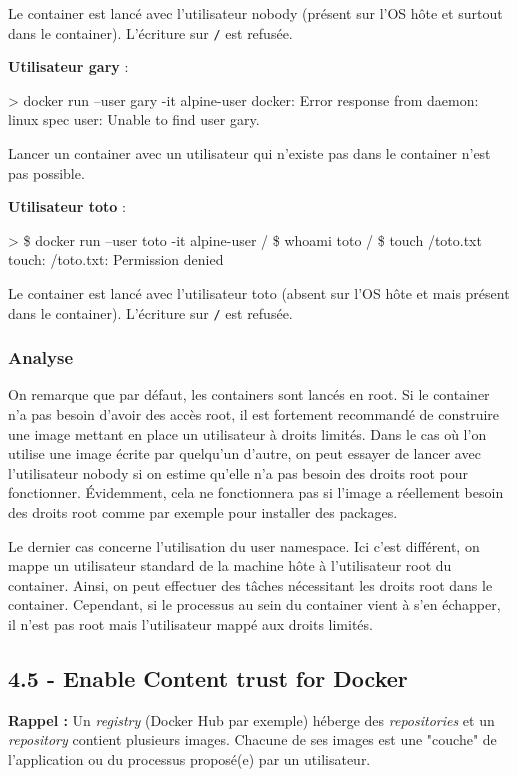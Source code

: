 \documentclass[11pt,a4paper,oneside]{report}
\newcommand{\code}[1]{\texttt{#1}}
\begin{document}
Le container est lancé avec l'utilisateur nobody (présent sur l'OS hôte et surtout dans le container). L'écriture sur \code{/} est refusée.


\textbf{Utilisateur gary} :
\begin{textcode}
> docker run --user gary -it alpine-user
docker: Error response from daemon: linux spec user: Unable to find user gary.
\end{textcode}

Lancer un container avec un utilisateur qui n'existe pas dans le container n'est pas possible.

\textbf{Utilisateur toto} :
\begin{textcode}
> \$ docker run --user toto -it alpine-user
/ \$ whoami
toto
/ \$ touch /toto.txt
touch: /toto.txt: Permission denied
\end{textcode}

Le container est lancé avec l'utilisateur toto (absent sur l'OS hôte et mais présent dans le container). L'écriture sur \code{/} est refusée.

\subsubsection{Analyse}
On remarque que par défaut, les containers sont lancés en root. Si le container n'a pas besoin d'avoir des accès root, il est fortement recommandé de construire une image mettant en place un utilisateur à droits limités. Dans le cas où l'on utilise une image écrite par quelqu'un d'autre, on peut essayer de lancer avec l'utilisateur nobody si on estime qu'elle n'a pas besoin des droits root pour fonctionner. Évidemment, cela ne fonctionnera pas si l'image a réellement besoin des droits root comme par exemple pour installer des packages.

Le dernier cas concerne l'utilisation du user namespace. Ici c'est différent, on mappe un utilisateur standard de la machine hôte à l'utilisateur root du container. Ainsi, on peut effectuer des tâches nécessitant les droits root dans le container. Cependant, si le processus au sein du container vient à s'en échapper, il n'est pas root mais l'utilisateur mappé aux droits limités.


\subsection{4.5  - Enable Content trust for Docker}
\textbf{Rappel :} Un \textit{registry} (Docker Hub par exemple) héberge des \textit{repositories} et un \textit{repository} contient plusieurs images. Chacune de ses images est une "couche" de l'application ou du processus proposé(e) par un utilisateur.
\end{document}
